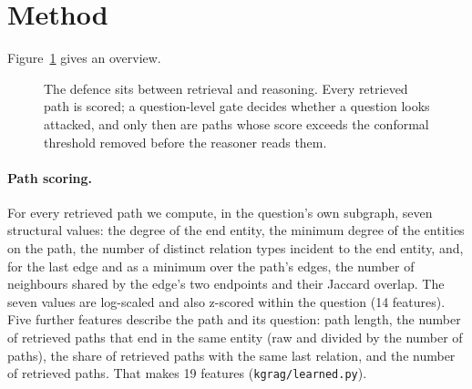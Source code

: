 \documentclass[preprint,12pt]{elsarticle}
\begin{document}
\section{Method}\label{sec:method}
Figure~\ref{fig:overview} gives an overview.
\begin{figure}[tbp]
\centering
{}
\caption{The defence sits between retrieval and reasoning. Every retrieved path is scored; a question-level gate decides whether a question looks attacked, and only then are paths whose score exceeds the conformal threshold removed before the reasoner reads them.}
\label{fig:overview}
\end{figure}

\paragraph{Path scoring.} For every retrieved path we compute, in the question's own subgraph, seven structural values: the degree of the end entity, the minimum degree of the entities on the path, the number of distinct relation types incident to the end entity, and, for the last edge and as a minimum over the path's edges, the number of neighbours shared by the edge's two endpoints and their Jaccard overlap. The seven values are log-scaled and also z-scored within the question (14 features). Five further features describe the path and its question: path length, the number of retrieved paths that end in the same entity (raw and divided by the number of paths), the share of retrieved paths with the same last relation, and the number of retrieved paths. That makes 19 features (\texttt{kgrag/learned.py}).
\end{document}
